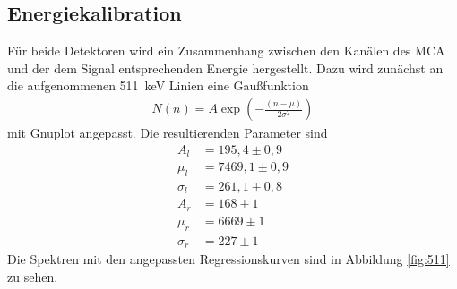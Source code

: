 \subsection{Energiekalibration}
Für beide Detektoren wird ein Zusammenhang zwischen den Kanälen des MCA und der dem Signal entsprechenden Energie hergestellt. Dazu wird zunächst an die aufgenommenen \SI{511}{\kilo\electronvolt} Linien eine Gaußfunktion
\begin{align}
  N(n)=A \exp \left( -\frac{(n-\mu)}{2 \sigma^2} \right)
  \label{eq:gauss}
\end{align}
mit Gnuplot angepasst. Die resultierenden Parameter sind
\begin{align*}
  A_l&=195,4 \pm 0,9\\
  \mu_l&=7469,1 \pm 0,9\\
  \sigma_l&=261,1 \pm 0,8\\
  A_r&=168 \pm 1\\
  \mu_r&=6669 \pm 1\\
  \sigma_r&=227 \pm 1
\end{align*}
Die Spektren mit den angepassten Regressionskurven sind in Abbildung \ref{fig:511} zu sehen. \newpage

